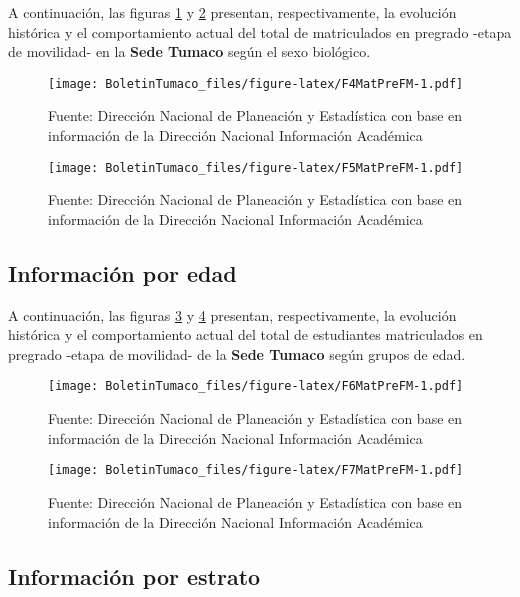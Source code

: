 \documentclass[
]{book}
\begin{document}
A continuación, las figuras \ref{fig:F4MatPreFM} y \ref{fig:F5MatPreFM} presentan, respectivamente, la evolución histórica y el comportamiento actual del total de matriculados en pregrado -etapa de movilidad- en la \textbf{Sede Tumaco} según el sexo biológico.

\begin{figure}
\centering
\texttt{[image: BoletinTumaco\_files/figure-latex/F4MatPreFM-1.pdf]}
\caption{\label{fig:F4MatPreFM}Fuente: Dirección Nacional de Planeación y Estadística con base en información de la Dirección Nacional Información Académica}
\end{figure}

\begin{figure}
\centering
\texttt{[image: BoletinTumaco\_files/figure-latex/F5MatPreFM-1.pdf]}
\caption{\label{fig:F5MatPreFM}Fuente: Dirección Nacional de Planeación y Estadística con base en información de la Dirección Nacional Información Académica}
\end{figure}

\hypertarget{informaciuxf3n-por-edad-4}{%
\subsection{Información por edad}\label{informaciuxf3n-por-edad-4}}

A continuación, las figuras \ref{fig:F6MatPreFM} y \ref{fig:F7MatPreFM} presentan, respectivamente, la evolución histórica y el comportamiento actual del total de estudiantes matriculados en pregrado -etapa de movilidad- de la \textbf{Sede Tumaco} según grupos de edad.

\begin{figure}
\centering
\texttt{[image: BoletinTumaco\_files/figure-latex/F6MatPreFM-1.pdf]}
\caption{\label{fig:F6MatPreFM}Fuente: Dirección Nacional de Planeación y Estadística con base en información de la Dirección Nacional Información Académica}
\end{figure}

\begin{figure}
\centering
\texttt{[image: BoletinTumaco\_files/figure-latex/F7MatPreFM-1.pdf]}
\caption{\label{fig:F7MatPreFM}Fuente: Dirección Nacional de Planeación y Estadística con base en información de la Dirección Nacional Información Académica}
\end{figure}

\hypertarget{informaciuxf3n-por-estrato-2}{%
\subsection{Información por estrato}\label{informaciuxf3n-por-estrato-2}}
\end{document}
